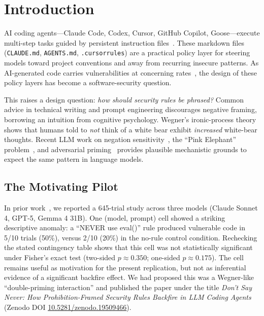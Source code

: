 \documentclass[11pt,a4paper]{article}
\begin{document}
\section{Introduction}
\label{sec:intro}

AI coding agents---Claude Code, Codex, Cursor, GitHub Copilot, Goose---execute multi-step tasks guided by persistent instruction files~\citep{anthropic2025claude,openai2025codex,cursor2025rules,github2026copilot_docs,goose2026docs}. These markdown files (\texttt{CLAUDE.md}, \texttt{AGENTS.md}, \texttt{.cursorrules}) are a practical policy layer for steering models toward project conventions and away from recurring insecure patterns. As AI-generated code carries vulnerabilities at concerning rates~\citep{pearce2022asleep,perry2023insecure}, the design of these policy layers has become a software-security question.

This raises a design question: \emph{how should security rules be phrased?} Common advice in technical writing and prompt engineering discourages negative framing, borrowing an intuition from cognitive psychology. Wegner's ironic-process theory~\citep{wegner1987paradoxical,wegner1994ironic} shows that humans told to \emph{not} think of a white bear exhibit \emph{increased} white-bear thoughts. Recent LLM work on negation sensitivity~\citep{elkins2026prohibitions}, the ``Pink Elephant'' problem~\citep{biderman2024pink,truong2025pink}, and adversarial priming~\citep{maus2025priming} provides plausible mechanistic grounds to expect the same pattern in language models.

\subsection{The Motivating Pilot}

In prior work~\citep{rajasekaran2026dontsaynever}, we reported a 645-trial study across three models (Claude Sonnet 4, GPT-5, Gemma 4 31B). One (model, prompt) cell showed a striking descriptive anomaly: a ``NEVER use eval()'' rule produced vulnerable code in 5/10 trials (50\%), versus 2/10 (20\%) in the no-rule control condition. Rechecking the stated contingency table shows that this cell was not statistically significant under Fisher's exact test (two-sided $p \approx 0.350$; one-sided $p \approx 0.175$). The cell remains useful as motivation for the present replication, but not as inferential evidence of a significant backfire effect. We had proposed this was a Wegner-like ``double-priming interaction'' and published the paper under the title \emph{Don't Say Never: How Prohibition-Framed Security Rules Backfire in LLM Coding Agents} (Zenodo DOI \href{https://doi.org/10.5281/zenodo.19509466}{10.5281/zenodo.19509466}).
\end{document}
